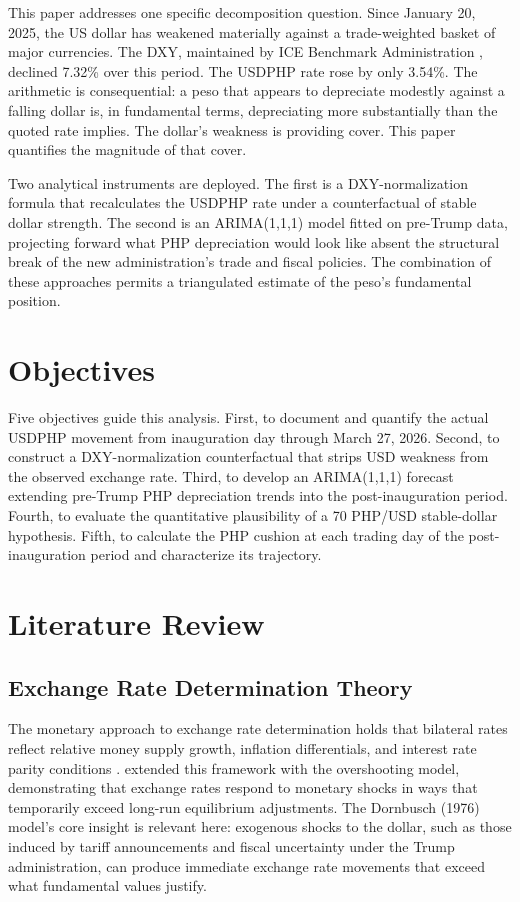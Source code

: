\documentclass[12pt]{article}
\begin{document}
This paper addresses one specific decomposition question. Since January 20, 2025,
the US dollar has weakened materially against a trade-weighted basket of major
currencies. The DXY, maintained by ICE Benchmark Administration \citep{ice2023},
declined 7.32\% over this period. The USDPHP rate rose by only 3.54\%. The arithmetic
is consequential: a peso that appears to depreciate modestly against a falling dollar
is, in fundamental terms, depreciating more substantially than the quoted rate implies.
The dollar's weakness is providing cover. This paper quantifies the magnitude of
that cover.

Two analytical instruments are deployed. The first is a DXY-normalization
formula that recalculates the USDPHP rate under a counterfactual of stable dollar
strength. The second is an ARIMA(1,1,1) model fitted on pre-Trump data, projecting
forward what PHP depreciation would look like absent the structural break of the
new administration's trade and fiscal policies. The combination of these approaches
permits a triangulated estimate of the peso's fundamental position.

\section{Objectives}

Five objectives guide this analysis. First, to document and quantify the actual
USDPHP movement from inauguration day through March 27, 2026. Second, to construct a
DXY-normalization counterfactual that strips USD weakness from the observed exchange
rate. Third, to develop an ARIMA(1,1,1) forecast extending pre-Trump PHP depreciation
trends into the post-inauguration period. Fourth, to evaluate the quantitative
plausibility of a 70 PHP/USD stable-dollar hypothesis. Fifth, to calculate the PHP
cushion at each trading day of the post-inauguration period and characterize its
trajectory.

\section{Literature Review}

\subsection{Exchange Rate Determination Theory}

The monetary approach to exchange rate determination holds that bilateral rates
reflect relative money supply growth, inflation differentials, and interest rate
parity conditions \citep{frenkel1976}. \citet{dornbusch1976} extended this framework
with the overshooting model, demonstrating that exchange rates respond to monetary
shocks in ways that temporarily exceed long-run equilibrium adjustments. The
Dornbusch (1976) model's core insight is relevant here: exogenous shocks to the
dollar, such as those induced by tariff announcements and fiscal uncertainty under the
Trump administration, can produce immediate exchange rate movements that exceed what
fundamental values justify.
\end{document}

